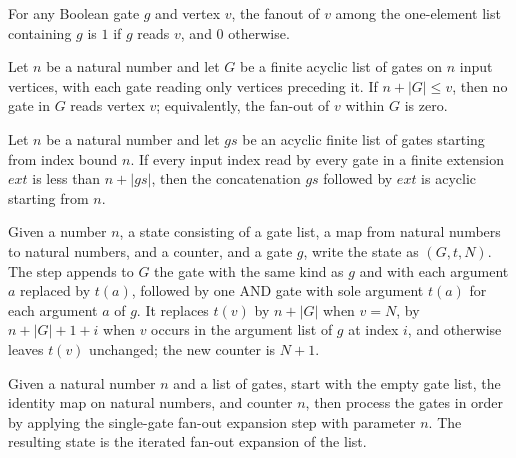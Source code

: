 \begin{theorem}
\label{BoolCircuit.fanoutIn_singleton}
\leanok
{}
For any Boolean gate $g$ and vertex $v$, the fanout of $v$ among the one-element list
containing $g$ is $1$ if $g$ reads $v$, and $0$ otherwise.
\end{theorem}

\begin{theorem}
\label{BoolCircuit.fanoutIn_eq_zero_of_le}
\leanok
{}
Let $n$ be a natural number and let $G$ be a finite acyclic list of gates on $n$ input
vertices, with each gate reading only vertices preceding it. If $n+|G|\le v$, then no
gate in $G$ reads vertex $v$; equivalently, the fan-out of $v$ within $G$ is zero.
\end{theorem}

\begin{theorem}
\label{BoolCircuit.gatesAcyclic_append_of_lt}
\leanok
{}
Let $n$ be a natural number and let $gs$ be an acyclic finite list of gates starting
from index bound $n$. If every input index read by every gate in a finite extension
$ext$ is less than $n+|gs|$, then the concatenation $gs$ followed by $ext$ is acyclic
starting from $n$.
\end{theorem}

\begin{definition}
\label{BoolCircuit.foStep}
\leanok
{}
Given a number $n$, a state consisting of a gate list, a map from natural numbers to
natural numbers, and a counter, and a gate $g$, write the state as $(G,t,N)$. The step
appends to $G$ the gate with the same kind as $g$ and with each argument $a$ replaced by
$t(a)$, followed by one AND gate with sole argument $t(a)$ for each argument $a$ of $g$.
It replaces $t(v)$ by $n+|G|$ when $v=N$, by $n+|G|+1+i$ when $v$ occurs in the argument
list of $g$ at index $i$, and otherwise leaves $t(v)$ unchanged; the new counter is
$N+1$.
\end{definition}

\begin{definition}
\label{BoolCircuit.foGates}
\leanok
{}
Given a natural number $n$ and a list of gates, start with the empty gate list, the
identity map on natural numbers, and counter $n$, then process the gates in order by
applying the single-gate fan-out expansion step with parameter $n$. The resulting state
is the iterated fan-out expansion of the list.
\end{definition}

